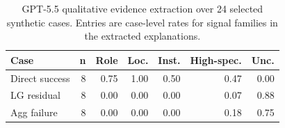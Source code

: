 \begin{table}[t]
\centering
\small
\setlength{\tabcolsep}{3pt}
\caption{GPT-5.5 qualitative evidence extraction over 24 selected synthetic cases. Entries are case-level rates for signal families in the extracted explanations.}
\label{tab:gpt55_evidence_signals}
\begin{tabular}{lrrrrrr}
\toprule
Case & n & Role & Loc. & Inst. & High-spec. & Unc. \\
\midrule
Direct success & 8 & 0.75 & 1.00 & 0.50 & 0.47 & 0.00 \\
LG residual & 8 & 0.00 & 0.00 & 0.00 & 0.07 & 0.88 \\
Agg failure & 8 & 0.00 & 0.00 & 0.00 & 0.18 & 0.75 \\
\bottomrule
\end{tabular}
\end{table}
